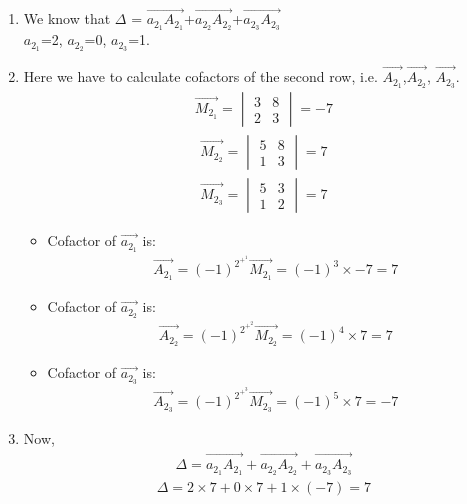 \begin{enumerate}
\item We know that $\Delta$ = $\vec{a_2_1A_2_1}$+$\vec{a_2_2A_2_2}$+$\vec{a_2_3A_2_3}$ \\
 $a_2_1$=2, $a_2_2$=0, $a_2_3$=1. \\
\item Here we have to calculate cofactors of the second row, i.e.
    $\vec{A_2_1}$,$\vec{A_2_2}$, $\vec{A_2_3}$.
\begin{align}
    \vec{M_2_1}= \begin{vmatrix} 3&8 \\ 2&3 \end{vmatrix}= -7
\end{align}
\begin{align}
    \vec{M_2_2}= \begin{vmatrix} 5&8 \\ 1&3 \end{vmatrix} = 7
\end{align}
\begin{align}
    \vec{M_2_3}= \begin{vmatrix} 5&3 \\ 1&2 \end{vmatrix} = 7
\end{align}
\begin{itemize}
    \item Cofactor of $\vec{a_2_1}$ is: 
\begin{align}
    \vec{A_2_1}=(-1)^2^+^1 \vec{M_2_1}= (-1)^3 \times -7= 7
\end{align}
\item Cofactor of $\vec{a_2_2}$ is: 
\begin{align}
    \vec{A_2_2}=(-1)^2^+^2 \vec{M_2_2}= (-1)^4 \times 7= 7
\end{align}
\item Cofactor of $\vec{a_2_3}$ is: 
\begin{align}
    \vec{A_2_3}=(-1)^2^+^3 \vec{M_2_3}= (-1)^5 \times 7= -7
\end{align}
\end{itemize}
\item Now,
\begin{align}
    \Delta = \vec{a_2_1A_2_1}+\vec{a_2_2A_2_2}+\vec{a_2_3A_2_3}
\end{align}
\begin{align}
    \Delta  = 2 \times 7 + 0 \times 7 + 1 \times (-7) = 7
\end{align}
\end{enumerate}